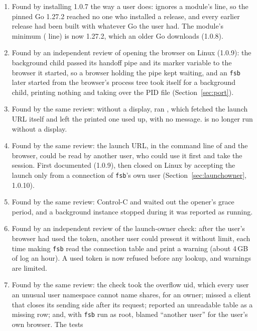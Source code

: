\begin{enumerate}
        Go 1.27.2 (1.0.7).
  \item Found by installing 1.0.7 the way a user does:  ignores a module's
         line, so the pinned Go 1.27.2 reached no one who installed a release, and
        every earlier release had been built with whatever Go the user had.  The module's
        minimum ( line) is now 1.27.2, which an older Go downloads (1.0.8).
  \item Found by an independent review of opening the browser on Linux (1.0.9): the background
        child passed its handoff pipe and its marker variable to the browser it started, so a
        browser holding the pipe kept  waiting, and an \texttt{fsb} later
        started from the browser's process tree took itself for a background child, printing
        nothing and taking over the PID file (Section~\ref{sec:port}).
  \item Found by the same review: without a display,  ran , which fetched
        the launch URL itself and left the printed one used up, with no message.
         is no longer run without a display.
  \item Found by the same review: the launch URL, in the command line of  and the
        browser, could be read by another user, who could use it first and take the session.
        First documented (1.0.9), then closed on Linux by accepting the launch only from a
        connection of \texttt{fsb}'s own user (Section~\ref{sec:launchowner}, 1.0.10).
  \item Found by the same review: Control-C and  waited out the opener's grace
        period, and a background instance stopped during it was reported as running.
  \item Found by an independent review of the launch-owner check: after the user's browser had
        used the token, another user could present it without limit, each time making
        \texttt{fsb} read the connection table and print a warning (about 4\,GB of log an hour).
        A used token is now refused before any lookup, and warnings are limited.
  \item Found by the same review: the check took the overflow uid, which every user an unusual
        user namespace cannot name shares, for an owner; missed a client that closes its sending
        side after its request; reported an unreadable table as a missing row; and, with
        \texttt{fsb} run as root, blamed ``another user'' for the user's own browser.  The tests

\end{enumerate}
